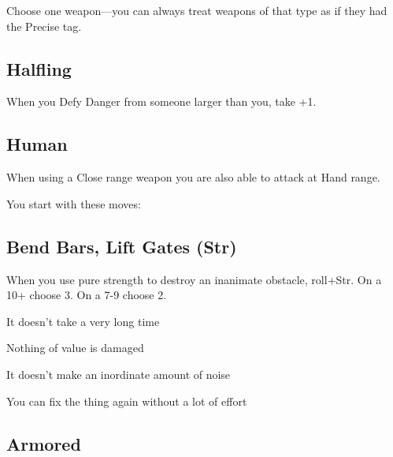 Choose one weapon—you can always treat weapons of that type as if they had the Precise tag.

           
\subsection{Halfling}  
           

When you Defy Danger from someone larger than you, take +1.

           
\subsection{Human}   
           

When using a Close range weapon you are also able to attack at Hand range.

         

         

           
\startInstructions
You start with these moves:
\stopInstructions
           
\subsection{Bend Bars, Lift Gates (Str)}       
           

When you use pure strength to destroy an inanimate obstacle, roll+Str. On a 10+ choose 3. On a 7-9 choose 2.

           
\startitemize[1,packed]
             
\item It doesn’t take a very long time

             
\item Nothing of value is damaged

             
\item It doesn’t make an inordinate amount of noise

             
\item You can fix the thing again without a lot of effort

           
\stopitemize
           
\subsection{Armored}   
           


